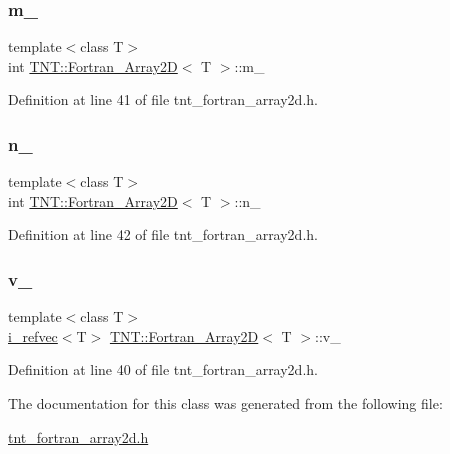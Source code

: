 \subsubsection{\texorpdfstring{m\+\_\+}{m\_}}
{\footnotesize\ttfamily template$<$class T$>$ \\
int \hyperlink{classTNT_1_1Fortran__Array2D}{T\+N\+T\+::\+Fortran\+\_\+\+Array2D}$<$ T $>$\+::m\+\_\+\hspace{0.3cm}{\ttfamily [private]}}



Definition at line 41 of file tnt\+\_\+fortran\+\_\+array2d.\+h.

\mbox{\label{classTNT_1_1Fortran__Array2D_a8b656d89a906bc217416b2c98d6b85ee}} 
\subsubsection{\texorpdfstring{n\+\_\+}{n\_}}
{\footnotesize\ttfamily template$<$class T$>$ \\
int \hyperlink{classTNT_1_1Fortran__Array2D}{T\+N\+T\+::\+Fortran\+\_\+\+Array2D}$<$ T $>$\+::n\+\_\+\hspace{0.3cm}{\ttfamily [private]}}



Definition at line 42 of file tnt\+\_\+fortran\+\_\+array2d.\+h.

\mbox{\label{classTNT_1_1Fortran__Array2D_abc689cf56a71ebea8c866abe193b0c9e}} 
\subsubsection{\texorpdfstring{v\+\_\+}{v\_}}
{\footnotesize\ttfamily template$<$class T$>$ \\
\hyperlink{classTNT_1_1i__refvec}{i\+\_\+refvec}$<$T$>$ \hyperlink{classTNT_1_1Fortran__Array2D}{T\+N\+T\+::\+Fortran\+\_\+\+Array2D}$<$ T $>$\+::v\+\_\+\hspace{0.3cm}{\ttfamily [private]}}



Definition at line 40 of file tnt\+\_\+fortran\+\_\+array2d.\+h.



The documentation for this class was generated from the following file\+:\begin{DoxyCompactItemize}
\item 
\hyperlink{tnt__fortran__array2d_8h}{tnt\+\_\+fortran\+\_\+array2d.\+h}\end{DoxyCompactItemize}
